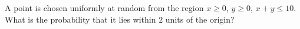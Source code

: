 A point is chosen uniformly at random from the region $x\ge0$, $y\ge0$, $x+y\le10$. What is the probability that it lies within $2$ units of the origin?
